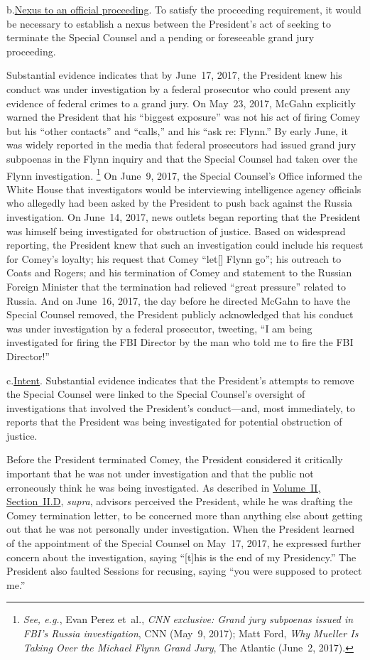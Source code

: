 b.\qquad\underline{Nexus to an official proceeding}.
To satisfy the proceeding requirement, it would be necessary to establish a nexus between the President's act of seeking to terminate the Special Counsel and a pending or foreseeable grand jury proceeding.

Substantial evidence indicates that by June~17, 2017, the President knew his conduct was under investigation by a federal prosecutor who could present any evidence of federal crimes to a grand jury.
On May~23, 2017, McGahn explicitly warned the President that his ``biggest exposure'' was not his act of firing Comey but his ``other contacts'' and ``calls,'' and his ``ask re: Flynn.''
By early June, it was widely reported in the media that federal prosecutors had issued grand jury subpoenas in the Flynn inquiry and that the Special Counsel had taken over the Flynn investigation.%
\footnote{\textit{See, e.g.}, Evan Perez et~al., \textit{CNN exclusive: Grand jury subpoenas issued in FBI's Russia investigation}, CNN (May~9, 2017);
Matt Ford, \textit{Why Mueller Is Taking Over the Michael Flynn Grand Jury}, The Atlantic (June~2, 2017).}
On June~9, 2017, the Special Counsel's Office informed the White House that investigators would be interviewing intelligence agency officials who allegedly had been asked by the President to push back against the Russia investigation.
On June~14, 2017, news outlets began reporting that the President was himself being investigated for obstruction of justice.
Based on widespread reporting, the President knew that such an investigation could include his request for Comey's loyalty;
his request that Comey ``let[] Flynn go'';
his outreach to Coats and Rogers;
and his termination of Comey and statement to the Russian Foreign Minister that the termination had relieved ``great pressure'' related to Russia.
And on June~16, 2017, the day before he directed McGahn to have the Special Counsel removed, the President publicly acknowledged that his conduct was under investigation by a federal prosecutor, tweeting, ``I am being investigated for firing the FBI Director by the man who told me to fire the FBI Director!''

c.\qquad\underline{Intent}.
Substantial evidence indicates that the President's attempts to remove the Special Counsel were linked to the Special Counsel's oversight of investigations that involved the President's conduct---and, most immediately, to reports that the President was being investigated for potential obstruction of justice.

Before the President terminated Comey, the President considered it critically important that he was not under investigation and that the public not erroneously think he was being investigated.
As described in \hyperlink{subsection.2.2.4}{Volume~II, Section~II.D}, \textit{supra}, advisors perceived the President, while he was drafting the Comey termination letter, to be concerned more than anything else about getting out that he was not personally under investigation.
When the President learned of the appointment of the Special Counsel on May~17, 2017, he expressed further concern about the investigation, saying ``[t]his is the end of my Presidency.''
The President also faulted Sessions for recusing, saying ``you were supposed to protect me.''


